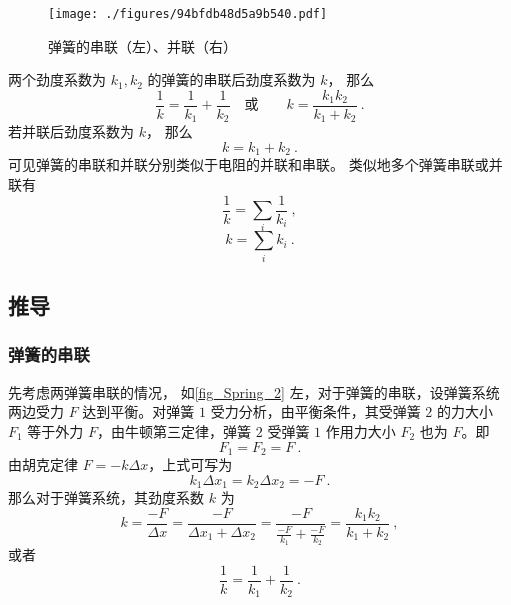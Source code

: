 

\begin{figure}[ht]
\centering
\texttt{[image: ./figures/94bfdb48d5a9b540.pdf]}
\caption{弹簧的串联（左）、并联（右）} \label{fig_Spring_2}
\end{figure}
两个劲度系数为 $k_1, k_2$ 的弹簧的串联后劲度系数为 $k$， 那么
\begin{equation}
\frac{1}{k} = \frac{1}{k_1} + \frac{1}{k_2}
\quad \text{或} \qquad
k = \frac{k_1 k_2}{k_1 + k_2}~.
\end{equation}
若并联后劲度系数为 $k$， 那么
\begin{equation}
k = k_1 + k_2~.
\end{equation}
可见弹簧的串联和并联分别类似于电阻的并联和串联。 类似地多个弹簧串联或并联有
\begin{equation}\label{eq_Spring_2}
\frac{1}{k} = \sum_i \frac{1}{k_i}~,
\end{equation}
\begin{equation}\label{eq_Spring_3}
k = \sum_i k_i~.
\end{equation}

\subsection{推导}
\subsubsection{弹簧的串联}
先考虑两弹簧串联的情况，
如\autoref{fig_Spring_2} 左，对于弹簧的串联，设弹簧系统两边受力 $F$ 达到平衡。对弹簧 $1$ 受力分析，由平衡条件，其受弹簧 $2$ 的力大小 $F_1$ 等于外力 $F$，由牛顿第三定律，弹簧 $2$ 受弹簧 $1$ 作用力大小 $F_2$ 也为 $F$。即
\begin{equation}
F_1=F_2=F~.
\end{equation}
由胡克定律 $F=-k\Delta x$，上式可写为
\begin{equation}
k_1\Delta x_1=k_2\Delta x_2=-F~.
\end{equation}
那么对于弹簧系统，其劲度系数 $k$ 为
\begin{equation}
k=\frac{-F}{\Delta x}=\frac{-F}{\Delta x_1+\Delta x_2}=\frac{-F}{\frac{-F}{k_1}+\frac{-F}{k_2}}=\frac{k_1k_2}{k_1+k_2}~,
\end{equation}
或者
\begin{equation}
\frac{1}{k}=\frac{1}{k_1}+\frac{1}{k_2}~.
\end{equation}

